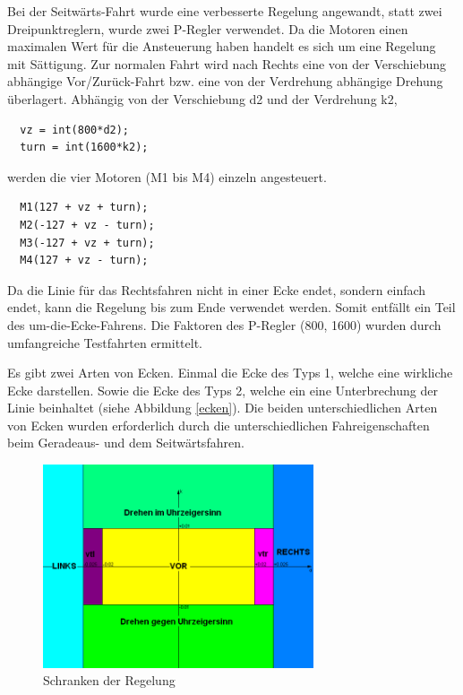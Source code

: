 \documentclass[a4paper,bibtotoc,oneside]{scrbook}
\begin{document}
\noindent Bei der Seitwärts-Fahrt wurde eine verbesserte Regelung angewandt, statt zwei Dreipunktreglern, wurde zwei P-Regler verwendet. Da die Motoren einen maximalen Wert für die Ansteuerung haben handelt es sich um eine Regelung mit Sättigung. Zur normalen Fahrt wird nach Rechts eine von der Verschiebung abhängige Vor/Zurück-Fahrt bzw. eine von der Verdrehung abhängige Drehung überlagert.
Abhängig von der Verschiebung d2 und der Verdrehung k2,
\begin{verbatim}
  vz = int(800*d2);
  turn = int(1600*k2);
\end{verbatim}
werden die vier Motoren (M1 bis M4) einzeln angesteuert.
\begin{verbatim}
  M1(127 + vz + turn);
  M2(-127 + vz - turn);
  M3(-127 + vz + turn);
  M4(127 + vz - turn); 
\end{verbatim}

\noindent Da die Linie für das Rechtsfahren nicht in einer Ecke endet, sondern einfach endet, kann die Regelung bis zum Ende verwendet werden. Somit entfällt ein Teil des um-die-Ecke-Fahrens. Die Faktoren des P-Regler (800, 1600) wurden durch umfangreiche Testfahrten ermittelt.

\noindent Es gibt zwei Arten von Ecken. Einmal die Ecke des Typs 1, welche eine wirkliche Ecke darstellen. Sowie die Ecke des Typs 2, welche ein eine Unterbrechung der Linie beinhaltet (siehe Abbildung \ref{ecken}).
Die beiden unterschiedlichen Arten von Ecken wurden erforderlich durch die unterschiedlichen Fahreigenschaften beim Geradeaus- und dem Seitwärtsfahren.





\begin{figure}[htbp]
\centering
\includegraphics[width=80mm]{img/schranken.png}
\caption{Schranken der Regelung}\label{schr}
\end{figure}
\end{document}

